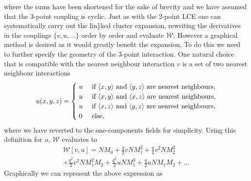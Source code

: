 %
where the sums have been shortened for the sake of brevity and we have assumed
that the 3-point coupling is cyclic. Just as with the 2-point LCE one can
systematically carry out the lin\}ked cluster expansion, rewriting the derivatives
in the couplings $\{v, u, \dots\}$ order by order and evaluate $\mathcal{W}$.
However a graphical method is desired as it would greatly benefit the
expansion. To do this we need to further specify the geometry of the 3-point
interaction. One natural choice that is compatible with the nearest neighbour
interaction $v$ is a set of two nearest neighbour interactions
%
\begin{equation} \label{eq:udef_wedge}
  u(x,y,z) = 
    \begin{cases}
      \hskip .1cm u & \text{ if $\langle x, y \rangle$ and $\langle y, z \rangle$ are nearest neighbours},\\
      \hskip .1cm u & \text{ if $\langle x, y \rangle$ and $\langle x, z \rangle$ are nearest neighbours},\\
      \hskip .1cm u & \text{ if $\langle x, z \rangle$ and $\langle y, z \rangle$ are nearest neighbours},\\
      \hskip .1cm 0 & \text{ else},
    \end{cases}
\end{equation}
%
where we have reverted to the one-components fields for simplicity. Using this
definition for $u$, $\mathcal{W}$ evaluates to 
%
\begin{multline}
  \mathcal{W}[v,u] = N M_0 + \frac{q}{2} v N M_1^2 + \frac{q}{4} v^2 N M_2^2 \\
    + \frac{q^2}{2} v^2 N M_1^2 M_2 + \frac{q^2}{2} u N M_1^3 + \frac{q}{2} u N
    M_1 M_2 + \dots
\end{multline}
%
Graphically we can represent the above expression as
%
